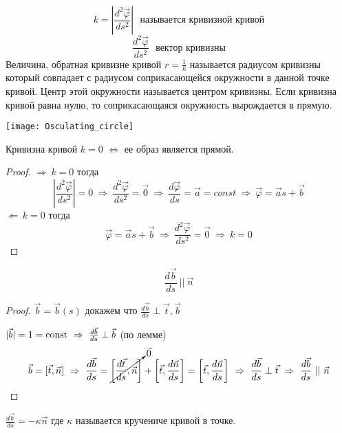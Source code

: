 \begin{define}
  $$
  k =
  \left|
    \frac{d^2 \vec \varphi}{d s^2}
  \right| ~~~
  \text{называется кривизной кривой}
  $$
  $$
    \frac{d^2 \vec \varphi}{d s^2} ~~~ \text{вектор кривизны}
  $$
  Величина, обратная кривизне кривой $r = \frac{1}{k}$ называется радиусом
  кривизны который совпадает с радиусом соприкасающейся окружности в данной
  точке кривой. Центр этой окружности называется центром кривизны. Если кривизна
  кривой равна нулю, то соприкасающаяся окружность вырождается в прямую.

  \texttt{[image: Osculating\_circle]}
\end{define}

\begin{theorem}
  Кривизна кривой $k = 0$ $\Leftrightarrow$ ее образ является прямой.
\end{theorem}

\begin{proof}
  $\Rightarrow ~ k = 0$ тогда
  $$
  \left| \frac{d^2 \vec \varphi}{ds^2} \right| = 0 ~ \Rightarrow ~
  \frac{d^2 \vec \varphi}{ds^2} = \vec 0 ~ \Rightarrow ~
  \frac{d\vec \varphi}{d s} = \vec a = const ~ \Rightarrow ~
  \vec \varphi = \vec a s + \vec b
  $$
  $\Leftarrow ~ k = 0$ тогда
  $$
  \vec \varphi = \vec a s + \vec b  ~ \Rightarrow ~
  \frac{d^2 \vec \varphi}{ds^2} = \vec 0 ~ \Rightarrow ~ k = 0
  $$
\end{proof}

\begin{block}[Лемма]
  $$
  \frac{d\vec b}{ds} ~ || ~ \vec n
  $$
\end{block}

\begin{proof}
  $\vec b = \vec b(s)$ докажем что $\frac{d \vec b}{ds} \perp \vec t, \vec b$

  $|\vec b| = 1 = \mathrm{const} ~ \Rightarrow ~ \frac{d\vec b}{ds} \perp \vec b$
  (по лемме)
  $$
  \vec b = [\vec t, \vec n] ~ \Rightarrow ~ \frac{d\vec b}{ds} =
  \cancelto{\vec 0}{\left[\frac{d \vec t}{ds}, \vec n\right]} +
  \left[\vec t, \frac{d\vec n}{ds}\right] =
  \left[\vec t, \frac{d\vec n}{ds}\right] ~ \Rightarrow ~ \frac{d\vec b}{ds}
  \perp \vec t ~ \Rightarrow ~  \frac{d\vec b}{ds} ~ || ~ \vec n
  $$
\end{proof}

\begin{define}
  $\frac{d\vec b}{ds} = -\kappa \vec n$ где $\kappa$ называется кручениче кривой
  в точке.
\end{define}

